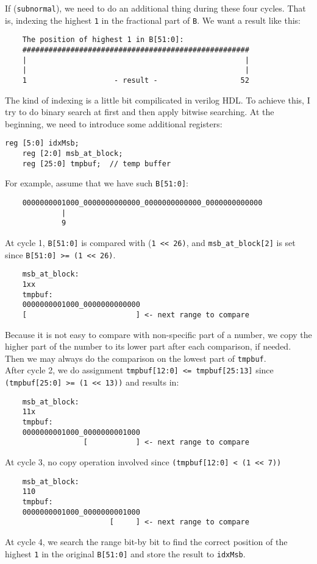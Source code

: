 \documentclass{article}
\begin{document}
                If ({\tt subnormal}), we need to do an additional thing during these four cycles. That is, indexing the highest {\tt 1} in the fractional part of {\tt B}.
                We want a result like this:
                \begin{lstlisting}
    The position of highest 1 in B[51:0]:
    ####################################################
    |                                                  |
    |                                                  |
    1                    - result -                   52
                \end{lstlisting}
                The kind of indexing is a little bit compilicated in verilog HDL. 
                To achieve this, I try to do binary search at first and then apply
                bitwise searching.
                At the beginning, we need to introduce some additional registers:
                \begin{lstlisting}[style = verilog-style]
    reg [5:0] idxMsb;
    reg [2:0] msb_at_block;
    reg [25:0] tmpbuf;  // temp buffer
                \end{lstlisting}
                For example, assume that we have such {\tt B[51:0]}:
                \begin{lstlisting}
    0000000001000_0000000000000_0000000000000_0000000000000
             |
             9
                \end{lstlisting}
                At cycle 1, {\tt B[51:0]} is compared with {(\tt 1 << 26)}, 
                and {\tt msb\_at\_block[2]} is set since {\tt B[51:0] >= (1 << 26)}.
                \begin{lstlisting}
    msb_at_block:
    1xx
    tmpbuf:
    0000000001000_0000000000000
    [                         ] <- next range to compare
                \end{lstlisting}
                Because it is not easy to compare with non-specific part of a number,
                we copy the higher part of the number to its lower part after each comparison, if needed.
                Then we may always do the comparison on the lowest part of {\tt tmpbuf}. \\
                After cycle 2, we do assignment {\tt tmpbuf[12:0] <= tmpbuf[25:13]} since {\tt (tmpbuf[25:0] >= (1 << 13))} and results in:
                \begin{lstlisting}
    msb_at_block:
    11x
    tmpbuf:
    0000000001000_0000000001000
                  [           ] <- next range to compare
                \end{lstlisting}
                At cycle 3, no copy operation involved since {\tt (tmpbuf[12:0] < (1 << 7))}
                \begin{lstlisting}
    msb_at_block:
    110
    tmpbuf:
    0000000001000_0000000001000
                        [     ] <- next range to compare
                \end{lstlisting}
                At cycle 4, we search the range bit-by bit to find the correct position of the highest {\tt 1} in the original {\tt B[51:0]} and store the result to {\tt idxMsb}.
\end{document}
